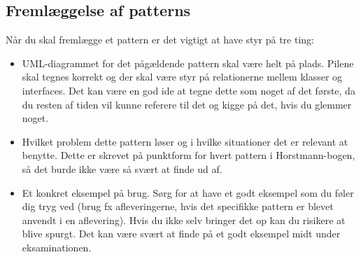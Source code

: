 \subsection{Fremlæggelse af patterns}
Når du skal fremlægge et pattern er det vigtigt at have styr på tre ting:
\begin{itemize}
    \item UML-diagrammet for det pågældende pattern skal være helt på plads. Pilene skal tegnes korrekt og der skal være styr på relationerne mellem klasser og interfaces. Det kan være en god ide at tegne dette som noget af det første, da du resten af tiden vil kunne referere til det og kigge på det, hvis du glemmer noget.
    \item Hvilket problem dette pattern løser og i hvilke situationer det er relevant at benytte. Dette er skrevet på punktform for hvert pattern i Horstmann-bogen, så det burde ikke være så svært at finde ud af.
    \item Et konkret eksempel på brug. Sørg for at have et godt eksempel som du føler dig tryg ved (brug fx afleveringerne, hvis det specifikke pattern er blevet anvendt i en aflevering). Hvis du ikke selv bringer det op kan du risikere at blive spurgt. Det kan være svært at finde på et godt eksempel midt under eksaminationen.
\end{itemize}
